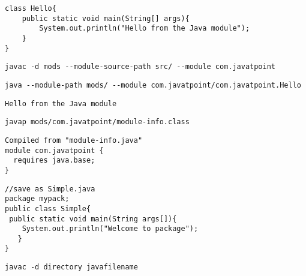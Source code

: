 \documentclass{book}
\def\lthtmlcheckvsize{\ifdim\ht\sizebox<\vsize 
  \ifdim\wd\sizebox<\hsize\expandafter\hfill\fi \expandafter\vfill
  \else\expandafter\vss\fi}%
\begin{document}
{\newpage\clearpage
{}%
\begin{lstlisting}
class Hello{  
    public static void main(String[] args){  
        System.out.println("Hello from the Java module");  
    }  
} 
\end{lstlisting}%
\lthtmlfigureZ
\lthtmlcheckvsize\clearpage}

{\newpage\clearpage
{}%
\begin{lstlisting}
javac -d mods --module-source-path src/ --module com.javatpoint  
\end{lstlisting}%
\lthtmlfigureZ
\lthtmlcheckvsize\clearpage}

{\newpage\clearpage
{}%
\begin{lstlisting}
java --module-path mods/ --module com.javatpoint/com.javatpoint.Hello  
\end{lstlisting}%
\lthtmlfigureZ
\lthtmlcheckvsize\clearpage}

{\newpage\clearpage
{}%
\begin{lstlisting}
Hello from the Java module
\end{lstlisting}%
\lthtmlfigureZ
\lthtmlcheckvsize\clearpage}

{\newpage\clearpage
{}%
\begin{lstlisting}
javap mods/com.javatpoint/module-info.class  
\end{lstlisting}%
\lthtmlfigureZ
\lthtmlcheckvsize\clearpage}

{\newpage\clearpage
{}%
\begin{lstlisting}
Compiled from "module-info.java"  
module com.javatpoint {  
  requires java.base;  
}  
\end{lstlisting}%
\lthtmlfigureZ
\lthtmlcheckvsize\clearpage}

{\newpage\clearpage
{}%
\begin{lstlisting}
//save as Simple.java  
package mypack;  
public class Simple{  
 public static void main(String args[]){  
    System.out.println("Welcome to package");  
   }  
}  
\end{lstlisting}%
\lthtmlfigureZ
\lthtmlcheckvsize\clearpage}

{\newpage\clearpage
{}%
\begin{lstlisting}
javac -d directory javafilename  
\end{lstlisting}%
\lthtmlfigureZ
\lthtmlcheckvsize\clearpage}
\end{document}
